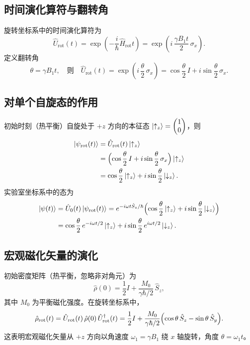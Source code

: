 \documentclass[12pt,a4paper]{article}
\begin{document}
	\subsection{时间演化算符与翻转角}
	
	旋转坐标系中的时间演化算符为
	\begin{equation}
		\hat{U}_{\text{rot}}(t) = \exp\!\left(-\frac{i}{\hbar}\hat{H}_{\text{rot}} t\right) = \exp\!\left(i\,\frac{\gamma B_1 t}{2}\,\sigma_x\right).
	\end{equation}
	定义翻转角
	\begin{equation}
		\theta = \gamma B_1 t, \quad \text{则} \quad \hat{U}_{\text{rot}}(t) = \exp\!\left(i\,\frac{\theta}{2}\,\sigma_x\right) = \cos\frac{\theta}{2}\,I + i\sin\frac{\theta}{2}\,\sigma_x.
	\end{equation}
	
	\subsection{对单个自旋态的作用}
	初始时刻（热平衡）自旋处于 $+z$ 方向的本征态 $\ket{\uparrow_z} = \begin{pmatrix}1\\0\end{pmatrix}$，则
	\begin{align}
		\ket{\psi_{\text{rot}}(t)} &= \hat{U}_{\text{rot}}(t)\ket{\uparrow_z} \notag\\
		&= \Bigl(\cos\frac{\theta}{2}\,I + i\sin\frac{\theta}{2}\,\sigma_x\Bigr)\ket{\uparrow_z} \notag\\
		&= \cos\frac{\theta}{2}\ket{\uparrow_z} + i\sin\frac{\theta}{2}\ket{\downarrow_z}.
	\end{align}
	实验室坐标系中的态为
	\begin{equation}
		\begin{aligned}
			\ket{\psi(t)} &= \hat{U}_0(t)\ket{\psi_{\text{rot}}(t)}
			               = e^{-i\omega t \hat{S}_z/\hbar}\Bigl(\cos\frac{\theta}{2}\ket{\uparrow_z}
			               + i\sin\frac{\theta}{2}\ket{\downarrow_z}\Bigr) \\
			&= \cos\frac{\theta}{2}\,e^{-i\omega t/2}\ket{\uparrow_z}
			   + i\sin\frac{\theta}{2}\,e^{i\omega t/2}\ket{\downarrow_z}.
		\end{aligned}
	\end{equation}
	
	\subsection{宏观磁化矢量的演化}
	初始密度矩阵（热平衡，忽略非对角元）为
	\begin{equation}
		\hat{\rho}(0) = \frac{1}{2}I + \frac{M_0}{\gamma\hbar/2}\,\hat{S}_z,
	\end{equation}
	其中 $M_0$ 为平衡磁化强度。在旋转坐标系中，
	\begin{equation}
		\hat{\rho}_{\text{rot}}(t) = \hat{U}_{\text{rot}}(t)\,\hat{\rho}(0)\,\hat{U}_{\text{rot}}^\dagger(t) = \frac{1}{2}I + \frac{M_0}{\gamma\hbar/2}\Bigl(\cos\theta\,\hat{S}_z - \sin\theta\,\hat{S}_y\Bigr).
	\end{equation}
	这表明宏观磁化矢量从 $+z$ 方向以角速度 $\omega_1 = \gamma B_1$ 绕 $x$ 轴旋转，角度 $\theta = \omega_1 t$。
	
\end{document}
